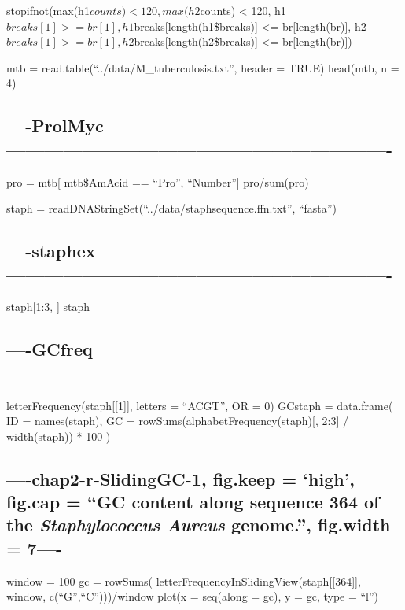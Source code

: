 \documentclass[]{article}
\begin{document}
stopifnot(max(h1\(counts) < 120, max(h2\)counts) \textless{} 120,
h1\(breaks[1] >= br[1], h1\)breaks{[}length(h1\$breaks){]} \textless{}=
br{[}length(br){]},
h2\(breaks[1] >= br[1], h2\)breaks{[}length(h2\$breaks){]} \textless{}=
br{[}length(br){]})

mtb = read.table(``../data/M\_tuberculosis.txt'', header = TRUE)
head(mtb, n = 4)

\subsection{----ProlMyc-------------------------------------------------------------}\label{prolmyc-}

pro = mtb{[} mtb\$AmAcid == ``Pro'', ``Number''{]} pro/sum(pro)

staph = readDNAStringSet(``../data/staphsequence.ffn.txt'', ``fasta'')

\subsection{----staphex-------------------------------------------------------------}\label{staphex-}

staph{[}1:3, {]} staph

\subsection{----GCfreq--------------------------------------------------------------}\label{gcfreq}

letterFrequency(staph{[}{[}1{]}{]}, letters = ``ACGT'', OR = 0) GCstaph
= data.frame( ID = names(staph), GC =
rowSums(alphabetFrequency(staph){[}, 2:3{]} / width(staph)) * 100 )

\subsection{\texorpdfstring{----chap2-r-SlidingGC-1, fig.keep = `high',
fig.cap = ``GC content along sequence 364 of the \emph{Staphylococcus
Aureus} genome.'', fig.width =
7----}{----chap2-r-SlidingGC-1, fig.keep = high, fig.cap = GC content along sequence 364 of the Staphylococcus Aureus genome., fig.width = 7----}}\label{chap2-r-slidinggc-1-fig.keep-high-fig.cap-gc-content-along-sequence-364-of-the-staphylococcus-aureus-genome.-fig.width-7-}

window = 100 gc = rowSums(
letterFrequencyInSlidingView(staph{[}{[}364{]}{]}, window,
c(``G'',``C'')))/window plot(x = seq(along = gc), y = gc, type = ``l'')
\end{document}
